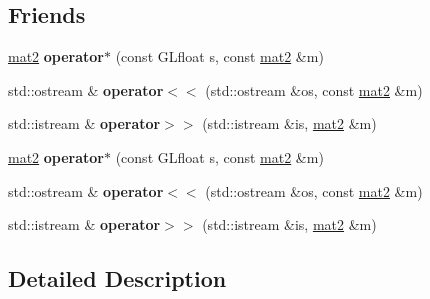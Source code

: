 \subsection*{\-Friends}
\begin{DoxyCompactItemize}
\item 
\hypertarget{class_angel_1_1mat2_a93186aa02a28897515079acad73bd0dd}{\hyperlink{class_angel_1_1mat2}{mat2} {\bfseries operator$\ast$} (const \-G\-Lfloat s, const \hyperlink{class_angel_1_1mat2}{mat2} \&m)}\label{class_angel_1_1mat2_a93186aa02a28897515079acad73bd0dd}

\item 
\hypertarget{class_angel_1_1mat2_a264412852cfa06a39b477d08b390d8e8}{std\-::ostream \& {\bfseries operator$<$$<$} (std\-::ostream \&os, const \hyperlink{class_angel_1_1mat2}{mat2} \&m)}\label{class_angel_1_1mat2_a264412852cfa06a39b477d08b390d8e8}

\item 
\hypertarget{class_angel_1_1mat2_a43f4ce08af11ef35f85de6c785b093a8}{std\-::istream \& {\bfseries operator$>$$>$} (std\-::istream \&is, \hyperlink{class_angel_1_1mat2}{mat2} \&m)}\label{class_angel_1_1mat2_a43f4ce08af11ef35f85de6c785b093a8}

\item 
\hypertarget{class_angel_1_1mat2_a93186aa02a28897515079acad73bd0dd}{\hyperlink{class_angel_1_1mat2}{mat2} {\bfseries operator$\ast$} (const \-G\-Lfloat s, const \hyperlink{class_angel_1_1mat2}{mat2} \&m)}\label{class_angel_1_1mat2_a93186aa02a28897515079acad73bd0dd}

\item 
\hypertarget{class_angel_1_1mat2_a264412852cfa06a39b477d08b390d8e8}{std\-::ostream \& {\bfseries operator$<$$<$} (std\-::ostream \&os, const \hyperlink{class_angel_1_1mat2}{mat2} \&m)}\label{class_angel_1_1mat2_a264412852cfa06a39b477d08b390d8e8}

\item 
\hypertarget{class_angel_1_1mat2_a43f4ce08af11ef35f85de6c785b093a8}{std\-::istream \& {\bfseries operator$>$$>$} (std\-::istream \&is, \hyperlink{class_angel_1_1mat2}{mat2} \&m)}\label{class_angel_1_1mat2_a43f4ce08af11ef35f85de6c785b093a8}

\end{DoxyCompactItemize}


\subsection{\-Detailed \-Description}


